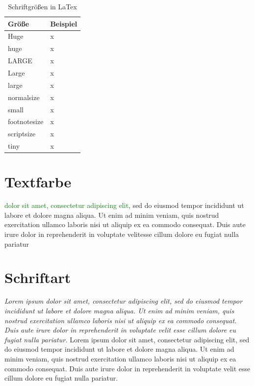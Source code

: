 \documentclass[12pt, a4paper]{article} %
\begin{document}
\begin{table}[h] 
\centering
\begin{tabular}{l | l}
\bf{Gr\"o\ss e} & \bf{Beispiel} \\
\hline 
Huge & x\\
\hline
huge & x\\
\hline
LARGE & x\\
\hline
Large & x\\
\hline 
large & x\\
\hline
normalsize & x\\
\hline
small & x\\
\hline
footnotesize & x\\
\hline
scriptsize & x\\
\hline
tiny & x\\
\end{tabular}
\caption{\label{tab4}Schriftgr\"o\ss en in LaTex }
\end{table}

\section{Textfarbe}


\textcolor{green}{dolor sit amet, consectetur adipiscing elit}, sed do eiusmod tempor incididunt ut labore et dolore magna aliqua. Ut enim ad minim veniam, quis nostrud exercitation ullamco laboris nisi ut aliquip ex ea commodo consequat. Duis aute irure dolor in reprehenderit in voluptate velitesse cillum dolore eu fugiat nulla pariatur
\section{Schriftart}


\textit{Lorem ipsum dolor sit amet, consectetur adipiscing elit, sed do eiusmod tempor incididunt ut labore et dolore magna aliqua. Ut enim ad minim veniam, quis nostrud exercitation ullamco laboris nisi ut aliquip ex ea commodo consequat. Duis aute irure dolor in reprehenderit in voluptate velit esse cillum dolore eu fugiat nulla pariatur.}
Lorem ipsum dolor sit amet, consectetur adipiscing elit, sed do eiusmod tempor incididunt ut labore et dolore magna aliqua. Ut enim ad minim veniam, quis nostrud exercitation ullamco laboris nisi ut aliquip ex ea commodo consequat. Duis aute irure dolor in reprehenderit in voluptate velit esse cillum dolore eu fugiat nulla pariatur.
\end{document}
